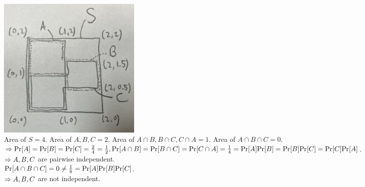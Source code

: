 \begin{pr}$ $\\
\includegraphics[width=7cm]{p5.JPG}\\
Area of $S=4$. Area of $A, B, C=2$. Area of $A\cap B, B\cap C, C\cap A=1$. Area of $A\cap B\cap C=0$.\\
$\then\P[A]=\P[B]=\P[C]=\frac24=\frac12, \P[A\cap B]=\P[B\cap C]=\P[C\cap A]=\frac14=\P[A]\P[B]=\P[B]\P[C]=\P[C]\P[A]$.\\
$\then A, B, C$ are pairwise independent.\\
$\P[A\cap B\cap C]=0\neq\frac18=\P[A]\P[B]\P[C]$.\\
$\then A, B, C$ are not independent.
\end{pr}
